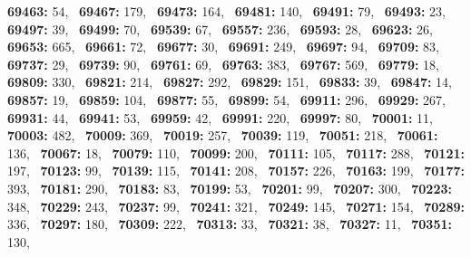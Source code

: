 \textbf{69463:} 54,\allowbreak~ 
\textbf{69467:} 179,\allowbreak~ 
\textbf{69473:} 164,\allowbreak~ 
\textbf{69481:} 140,\allowbreak~ 
\textbf{69491:} 79,\allowbreak~ 
\textbf{69493:} 23,\allowbreak~ 
\textbf{69497:} 39,\allowbreak~ 
\textbf{69499:} 70,\allowbreak~ 
\textbf{69539:} 67,\allowbreak~ 
\textbf{69557:} 236,\allowbreak~ 
\textbf{69593:} 28,\allowbreak~ 
\textbf{69623:} 26,\allowbreak~ 
\textbf{69653:} 665,\allowbreak~ 
\textbf{69661:} 72,\allowbreak~ 
\textbf{69677:} 30,\allowbreak~ 
\textbf{69691:} 249,\allowbreak~ 
\textbf{69697:} 94,\allowbreak~ 
\textbf{69709:} 83,\allowbreak~ 
\textbf{69737:} 29,\allowbreak~ 
\textbf{69739:} 90,\allowbreak~ 
\textbf{69761:} 69,\allowbreak~ 
\textbf{69763:} 383,\allowbreak~ 
\textbf{69767:} 569,\allowbreak~ 
\textbf{69779:} 18,\allowbreak~ 
\textbf{69809:} 330,\allowbreak~ 
\textbf{69821:} 214,\allowbreak~ 
\textbf{69827:} 292,\allowbreak~ 
\textbf{69829:} 151,\allowbreak~ 
\textbf{69833:} 39,\allowbreak~ 
\textbf{69847:} 14,\allowbreak~ 
\textbf{69857:} 19,\allowbreak~ 
\textbf{69859:} 104,\allowbreak~ 
\textbf{69877:} 55,\allowbreak~ 
\textbf{69899:} 54,\allowbreak~ 
\textbf{69911:} 296,\allowbreak~ 
\textbf{69929:} 267,\allowbreak~ 
\textbf{69931:} 44,\allowbreak~ 
\textbf{69941:} 53,\allowbreak~ 
\textbf{69959:} 42,\allowbreak~ 
\textbf{69991:} 220,\allowbreak~ 
\textbf{69997:} 80,\allowbreak~ 
\textbf{70001:} 11,\allowbreak~ 
\textbf{70003:} 482,\allowbreak~ 
\textbf{70009:} 369,\allowbreak~ 
\textbf{70019:} 257,\allowbreak~ 
\textbf{70039:} 119,\allowbreak~ 
\textbf{70051:} 218,\allowbreak~ 
\textbf{70061:} 136,\allowbreak~ 
\textbf{70067:} 18,\allowbreak~ 
\textbf{70079:} 110,\allowbreak~ 
\textbf{70099:} 200,\allowbreak~ 
\textbf{70111:} 105,\allowbreak~ 
\textbf{70117:} 288,\allowbreak~ 
\textbf{70121:} 197,\allowbreak~ 
\textbf{70123:} 99,\allowbreak~ 
\textbf{70139:} 115,\allowbreak~ 
\textbf{70141:} 208,\allowbreak~ 
\textbf{70157:} 226,\allowbreak~ 
\textbf{70163:} 199,\allowbreak~ 
\textbf{70177:} 393,\allowbreak~ 
\textbf{70181:} 290,\allowbreak~ 
\textbf{70183:} 83,\allowbreak~ 
\textbf{70199:} 53,\allowbreak~ 
\textbf{70201:} 99,\allowbreak~ 
\textbf{70207:} 300,\allowbreak~ 
\textbf{70223:} 348,\allowbreak~ 
\textbf{70229:} 243,\allowbreak~ 
\textbf{70237:} 99,\allowbreak~ 
\textbf{70241:} 321,\allowbreak~ 
\textbf{70249:} 145,\allowbreak~ 
\textbf{70271:} 154,\allowbreak~ 
\textbf{70289:} 336,\allowbreak~ 
\textbf{70297:} 180,\allowbreak~ 
\textbf{70309:} 222,\allowbreak~ 
\textbf{70313:} 33,\allowbreak~ 
\textbf{70321:} 38,\allowbreak~ 
\textbf{70327:} 11,\allowbreak~ 
\textbf{70351:} 130,\allowbreak~ 
